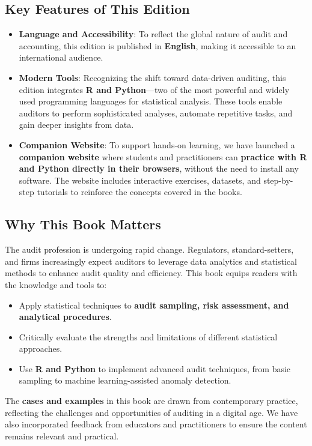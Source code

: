 \documentclass[11pt]{memoir}
\theoremstyle{definition} %
\begin{document}
\subsection*{Key Features of This Edition}
\begin{itemize}
    \item \textbf{Language and Accessibility}: To reflect the global nature of audit and accounting, this edition is published in \textbf{English}, making it accessible to an international audience.
    \item \textbf{Modern Tools}: Recognizing the shift toward data-driven auditing, this edition integrates \textbf{R and Python}---two of the most powerful and widely used programming languages for statistical analysis. These tools enable auditors to perform sophisticated analyses, automate repetitive tasks, and gain deeper insights from data.
    \item \textbf{Companion Website}: To support hands-on learning, we have launched a \textbf{companion website} where students and practitioners can \textbf{practice with R and Python directly in their browsers}, without the need to install any software. The website includes interactive exercises, datasets, and step-by-step tutorials to reinforce the concepts covered in the books.
\end{itemize}

\subsection*{Why This Book Matters}
The audit profession is undergoing rapid change. Regulators, standard-setters, and firms increasingly expect auditors to leverage data analytics and statistical methods to enhance audit quality and efficiency. This book equips readers with the knowledge and tools to:
\begin{itemize}
    \item Apply statistical techniques to \textbf{audit sampling, risk assessment, and analytical procedures}.
    \item Critically evaluate the strengths and limitations of different statistical approaches.
    \item Use \textbf{R and Python} to implement advanced audit techniques, from basic sampling to machine learning-assisted anomaly detection.
\end{itemize}

The \textbf{cases and examples} in this book are drawn from contemporary practice, reflecting the challenges and opportunities of auditing in a digital age. We have also incorporated feedback from educators and practitioners to ensure the content remains relevant and practical.
\end{document}
